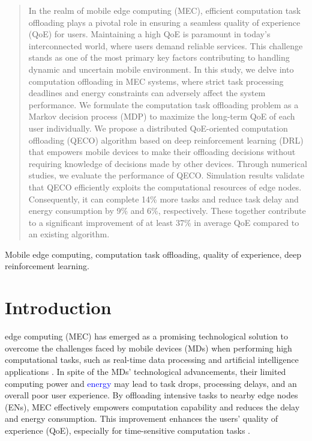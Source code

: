 \documentclass[12pt,draftclsnofoot,onecolumn]{IEEEtran}
\begin{document}


\begin{abstract}
	In the realm of mobile edge computing (MEC), efficient computation task offloading plays a pivotal role in ensuring a seamless quality of experience (QoE) for users. Maintaining a high QoE is paramount in today's interconnected world, where users demand reliable services. This challenge stands as one of the most primary key factors contributing to handling dynamic and uncertain mobile environment. In this study, we delve into computation offloading in MEC systems, where strict task processing deadlines and energy constraints can adversely affect the system performance. We formulate the computation task offloading problem as a Markov decision process (MDP) to maximize the long-term QoE of each user individually. We propose a distributed QoE-oriented computation offloading (QECO) algorithm based on deep reinforcement learning (DRL) that empowers mobile devices to make their offloading decisions without requiring knowledge of decisions made by other devices. Through numerical studies, we evaluate the performance of QECO. Simulation results validate that QECO efficiently exploits the computational resources of edge nodes. Consequently, it can complete 14\% more tasks and reduce task delay and energy consumption by 9\% and 6\%, respectively. These together contribute to a significant improvement of at least 37\% in average QoE compared to an existing algorithm.
\end{abstract}

\begin{IEEEkeywords}
	Mobile edge computing, computation task offloading, quality of experience, deep reinforcement learning.
\end{IEEEkeywords}


\section{Introduction} 

edge computing (MEC) \cite{mao2017survey} has emerged as a promising technological solution to overcome the challenges faced by mobile devices (MDs) when performing high computational tasks, such as real-time data processing and artificial intelligence applications \cite{zhou2019edge} \cite{yousefpour2019all}. In spite of the MDs' technological advancements, their limited computing power and \textcolor{blue}{energy} may lead to task drops, processing delays, and an overall poor user experience. By offloading intensive tasks to nearby edge nodes (ENs), MEC effectively empowers computation capability and reduces the delay and energy consumption. This improvement enhances the users' quality of experience (QoE), especially for time-sensitive computation tasks \cite{TNSE-QOE-24} \cite{shah2018hierarchical}. 
\end{document}
